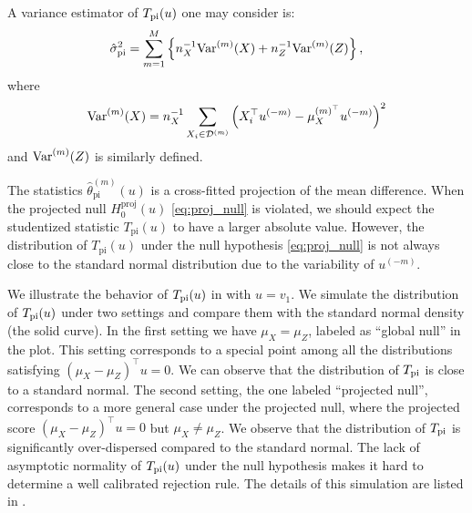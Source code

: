 \documentclass[11pt]{article}
\begin{document}
A variance estimator of $T_{\rm pi}(u)$ one may consider is:
\begin{equation}\label{eq: cross-fitting variance}
\hat \sigma_{\rm pi}^2 = 
\sum_{m=1}^M \left\{n_X^{-1}{\rm Var}^{(m)}(X) +  
n_Z^{-1}{\rm Var}^{(m)}(Z)\right\},
\end{equation}
where
\begin{equation}
    {\rm Var}^{(m)}(X) = n_X^{-1}\sum_{X_i \in \mathcal{D}^{(m)}}\left(X_i^{\top} u^{(-m)}-\mu_X^{(m)^{\top}} u^{(-m)}\right)^2
\end{equation}
and $ {\rm Var}^{(m)}(Z)$ is similarly defined.

The statistics $\hat{\theta}_{\mathrm{pi}}^{(m)}(u)$ is a cross-fitted projection of the mean difference. When the projected null $H_0^{\mathrm{proj}}(u)$ \eqref{eq:proj_null} is violated, we should expect the studentized statistic $T_{\mathrm{pi}}(u)$ to have a larger absolute value. However, the distribution of $T_{\mathrm{pi}}(u)$ under the null hypothesis \eqref{eq:proj_null} is not always close to the standard normal distribution due to the variability of $u^{(-m)}$.

We illustrate the behavior of $T_{\rm pi}(u)$ in  with $u=v_1$.
We simulate the distribution of $T_{\rm pi}(u)$ under two settings and compare them with the standard normal density (the solid curve). In the first setting we have  $\mu_X = \mu_Z$, labeled as ``global null'' in the plot. This setting corresponds to a special point among all the distributions satisfying $(\mu_X - \mu_Z)^\top u = 0$. We can observe that the distribution of $T_{\rm pi}$ is close to a standard normal.
The second setting, the one labeled ``projected null'', corresponds to a more general case under the projected null, where the projected score $\left(\mu_X-\mu_Z\right)^{\top} u=0$ but $\mu_X \neq \mu_Z$. We observe that the distribution of $T_{\rm pi}$ is significantly over-dispersed compared to the standard normal. The lack of asymptotic normality of $T_{\rm pi}(u)$ under the null hypothesis makes it hard to determine a well calibrated rejection rule. 
The details of this simulation are listed in .  
\end{document}
